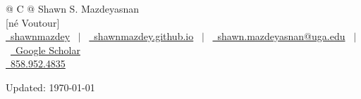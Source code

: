 \documentclass[letterpaper,12pt]{article}
\begin{document}
\pagestyle{plain} 



\begin{tabularx}{\linewidth}{@{} C @{}}
{\Huge Shawn S. Mazdeyasnan} \\ [0.5ex]
{\Large [né Voutour]} \\ [1em]
\href{https://github.com/shawnmazdey}{\raisebox{-0.05\height}\faGithub\ shawnmazdey} \ $|$ \ 
\href{https://shawnmazdey.github.io}{\raisebox{-0.05\height}\faGlobe \ shawnmazdey.github.io} \ $|$ \ 
\href{mailto:ssv86618@uga.edu}{\raisebox{-0.05\height}\faEnvelope \ shawn.mazdeyasnan@uga.edu} \ $|$ \ 
\href{https://scholar.google.com/citations?user=nkajI3sAAAAJ\&hl=en}{\raisebox{-0.05\height}\aiGoogleScholar\ Google Scholar} \\
\href{tel:+018589524835}{\raisebox{-0.05\height}\faMobile \ 858.952.4835} \\
\end{tabularx}
\par
\begin{center}
\footnotesize Updated: \today
\end{center}

\end{document}
